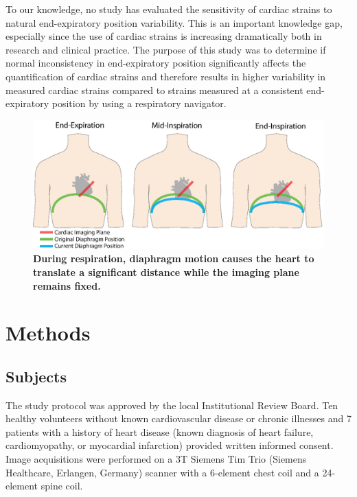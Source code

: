 	To our knowledge, no study has evaluated the sensitivity of cardiac strains to natural end-expiratory position variability. This is an important knowledge gap, especially since the use of cardiac strains is increasing dramatically both in research and clinical practice. The purpose of this study was to determine if normal inconsistency in end-expiratory position significantly affects the quantification of cardiac strains and therefore results in higher variability in measured cardiac strains compared to strains measured at a consistent end-expiratory position by using a respiratory navigator.
	
	\begin{figure} 
		\includegraphics{figures/strainpaper/Fig1-range_of_diaphragm_position_breathing}
		\caption[During respiration, diaphragm motion causes the heart to translate a significant distance while the imaging plane remains fixed]{\textbf{During respiration, diaphragm motion causes the heart to translate a significant distance while the imaging plane remains fixed.}}
		\label{fig:diaphragmTranslation}
	\end{figure}

\section{Methods}

\subsection{Subjects}
	The study protocol was approved by the local Institutional Review Board. Ten healthy volunteers without known cardiovascular disease or chronic illnesses and 7 patients with a history of heart disease (known diagnosis of heart failure, cardiomyopathy, or myocardial infarction) provided written informed consent. Image acquisitions were performed on a 3T Siemens Tim Trio (Siemens Healthcare, Erlangen, Germany) scanner with a 6-element chest coil and a 24-element spine coil.

